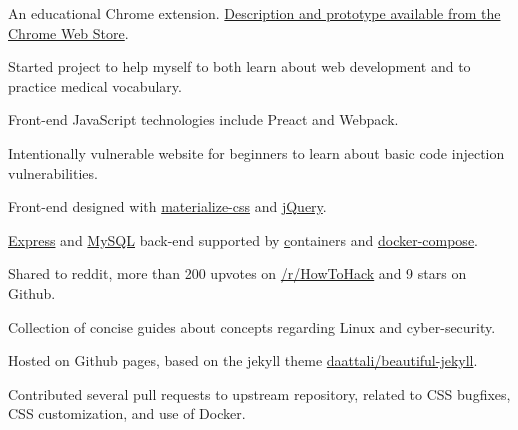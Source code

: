 

\begin{cventries}
  {
    \begin{cvitems}
      \item{An educational Chrome extension. \href{https://chrome.google.com/webstore/detail/mind-matter/ailffedpjgpjbdadlieaccchpcdiafjc}{Description and prototype available from the Chrome Web Store}.}
      \item{Started project to help myself to both learn about web development and to practice medical vocabulary.}
      \item{Front-end JavaScript technologies include Preact and Webpack.}
    \end{cvitems}
  }
  {
    \begin{cvitems}
      \item{Intentionally vulnerable website for beginners to learn about basic code injection vulnerabilities.}
      \item{Front-end designed with \href{http://materializecss.com/}{materialize-css} and \href{https://jquery.com/}{jQuery}.}
      \item{\href{https://expressjs.com/}{Express} and \href{https://www.mysql.com/}{MySQL} back-end supported by \href{Docker} containers and \href{https://docs.docker.com/compose/overview/}{docker-compose}.}
      \item{Shared to reddit, more than 200 upvotes on \href{https://www.reddit.com/r/HowToHack/comments/7zcfqd/i_made_an_easytohack_web_application_for/?ref=share&ref_source=link}{/r/HowToHack} and 9 stars on Github.}
    \end{cvitems}
  }
  {
    \begin{cvitems}
      \item{Collection of concise guides about concepts regarding Linux and cyber-security.}
      \item{Hosted on Github pages, based on the jekyll theme \href{https://github.com/daattali/beautiful-jekyll}{daattali/beautiful-jekyll}.}
      \item{Contributed several pull requests to upstream repository, related to CSS bugfixes, CSS customization, and use of Docker.}
    \end{cvitems}
  }

\end{cventries}
